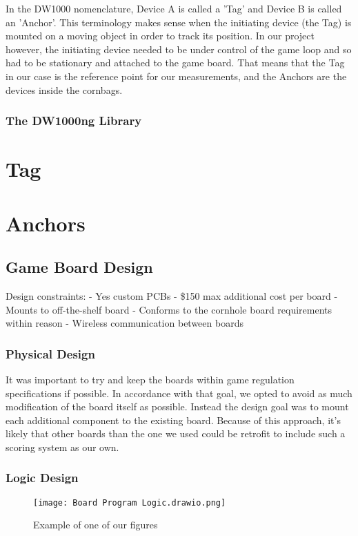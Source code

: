 \documentclass{article}
\begin{document}
In the DW1000 nomenclature, Device A is called a 'Tag' and Device B is called an 'Anchor'. This terminology makes sense when the initiating device (the Tag) is mounted on a moving object in order to track its position. In our project however, the initiating device needed to be under control of the game loop and so had to be stationary and attached to the game board. That means that the Tag in our case is the reference point for our measurements, and the Anchors are the devices inside the cornbags. 

\subsubsection{The DW1000ng Library}

\section{Tag}

\section{Anchors}

\subsection{Game Board Design}

Design constraints:
- Yes custom PCBs
- \$150 max additional cost per board
- Mounts to off-the-shelf board 
- Conforms to the cornhole board requirements within reason
- Wireless communication between boards

\subsubsection{Physical Design}
It was important to try and keep the boards within game regulation specifications if possible. In accordance with that goal, we opted to avoid as much modification of the board itself as possible. Instead the design goal was to mount each additional component to the existing board. Because of this approach, it's likely that other boards than the one we used could be retrofit to include such a scoring system as our own.
\subsubsection{Logic Design}
\begin{figure}
    \centering
    \texttt{[image: Board Program Logic.drawio.png]}
    \caption{Example of one of our figures}
    \label{fig:my_label}
\end{figure}
\end{document}
